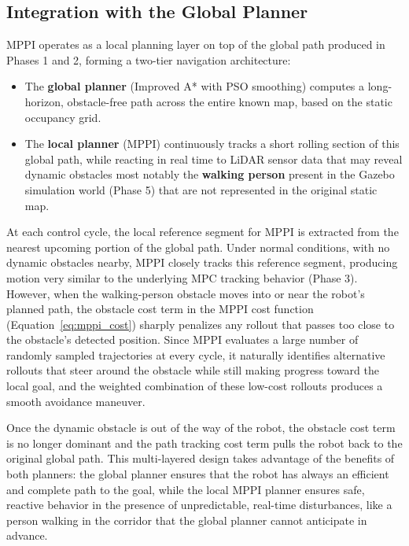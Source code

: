 \subsection{Integration with the Global Planner}
\label{subsec:mppi_integration}

MPPI operates as a local planning layer on top of the global path produced in Phases 1 and 2, forming a two-tier navigation architecture:

\begin{itemize}[noitemsep]
	\item The \textbf{global planner} (Improved A* with PSO smoothing) computes a long-horizon, obstacle-free path across the entire known map, based on the static occupancy grid.
	\item The \textbf{local planner} (MPPI) continuously tracks a short rolling section of this global path, while reacting in real time to LiDAR sensor data that may reveal dynamic obstacles  most notably the \textbf{walking person} present in the Gazebo simulation world (Phase 5) that are not represented in the original static map.
\end{itemize}

At each control cycle, the local reference segment for MPPI is extracted from the nearest upcoming portion of the global path. Under normal conditions, with no dynamic obstacles nearby, MPPI closely tracks this reference segment, producing motion very similar to the underlying MPC tracking behavior (Phase 3). However, when the walking-person obstacle moves into or near the robot's planned path, the obstacle cost term in the MPPI cost function (Equation~\ref{eq:mppi_cost}) sharply penalizes any rollout that passes too close to the obstacle's detected position. Since MPPI evaluates a large number of randomly sampled trajectories at every cycle, it naturally identifies alternative rollouts that steer around the obstacle while still making progress toward the local goal, and the weighted combination of these low-cost rollouts produces a smooth avoidance maneuver.

Once the dynamic obstacle is out of the way of the robot, the obstacle cost term is no longer dominant and the path tracking cost term pulls the robot back to the original global path. This multi-layered design takes advantage of the benefits of both planners: the global planner ensures that the robot has always an efficient and complete path to the goal, while the local MPPI planner ensures safe, reactive behavior in the presence of unpredictable, real-time disturbances, like a person walking in the corridor that the global planner cannot anticipate in advance.



